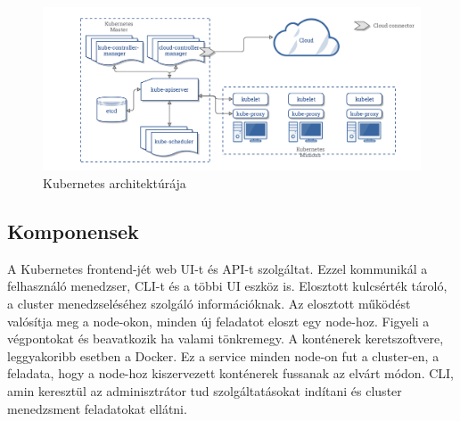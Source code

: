 \begin{figure}
	\centering
	\includegraphics[width=\linewidth]{figures/kube_arch.png}
	\caption{Kubernetes architektúrája \cite{kube-arch}}
	\label{fig:kubearch}
\end{figure}

\subsection{Komponensek}
A Kubernetes frontend-jét web UI-t és API-t szolgáltat. Ezzel kommunikál a felhasználó menedzser, CLI-t és a többi UI eszköz is. 
Elosztott kulcsérték tároló, a cluster menedzseléséhez szolgáló információknak.
Az elosztott működést valósítja meg a node-okon, minden új feladatot eloszt egy node-hoz.
Figyeli a végpontokat és beavatkozik ha valami tönkremegy.
A konténerek keretszoftvere, leggyakoribb esetben a Docker.
Ez a service minden node-on fut a cluster-en, a feladata, hogy a node-hoz kiszervezett konténerek fussanak az elvárt módon.
CLI, amin keresztül az adminisztrátor tud szolgáltatásokat indítani és cluster menedzsment feladatokat ellátni.


